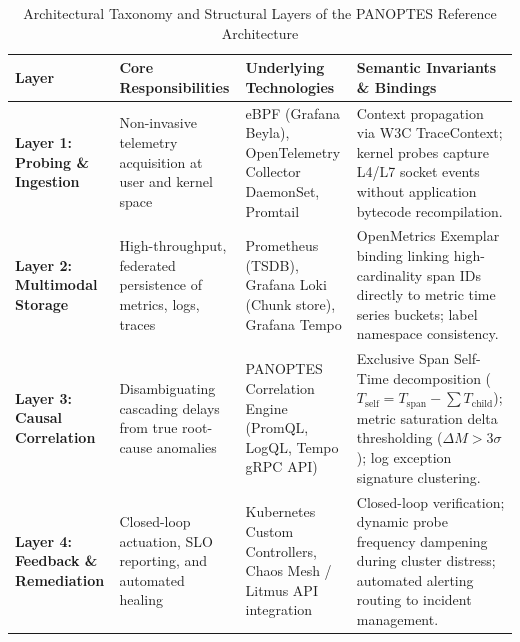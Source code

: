 \begin{table}[!htbp]
\centering
\small
\caption{Architectural Taxonomy and Structural Layers of the PANOPTES Reference Architecture}
\label{tab:panoptes_layers}
\begin{tabularx}{\textwidth}{@{}l p{3.6cm} p{4.2cm} X@{}}
\toprule
\textbf{Layer} & \textbf{Core Responsibilities} & \textbf{Underlying Technologies} & \textbf{Semantic Invariants \& Bindings} \\ \midrule
\textbf{Layer 1: Probing \& Ingestion} & Non-invasive telemetry acquisition at user and kernel space & eBPF (Grafana Beyla), OpenTelemetry Collector DaemonSet, Promtail & Context propagation via W3C TraceContext; kernel probes capture L4/L7 socket events without application bytecode recompilation. \\ \addlinespace[2pt]
\textbf{Layer 2: Multimodal Storage} & High-throughput, federated persistence of metrics, logs, traces & Prometheus (TSDB), Grafana Loki (Chunk store), Grafana Tempo & OpenMetrics Exemplar binding linking high-cardinality span IDs directly to metric time series buckets; label namespace consistency. \\ \addlinespace[2pt]
\textbf{Layer 3: Causal Correlation} & Disambiguating cascading delays from true root-cause anomalies & PANOPTES Correlation Engine (PromQL, LogQL, Tempo gRPC API) & Exclusive Span Self-Time decomposition ($T_{\text{self}} = T_{\text{span}} - \sum T_{\text{child}}$); metric saturation delta thresholding ($\Delta M > 3\sigma$); log exception signature clustering. \\ \addlinespace[2pt]
\textbf{Layer 4: Feedback \& Remediation} & Closed-loop actuation, SLO reporting, and automated healing & Kubernetes Custom Controllers, Chaos Mesh / Litmus API integration & Closed-loop verification; dynamic probe frequency dampening during cluster distress; automated alerting routing to incident management. \\ \bottomrule
\end{tabularx}
\end{table}
